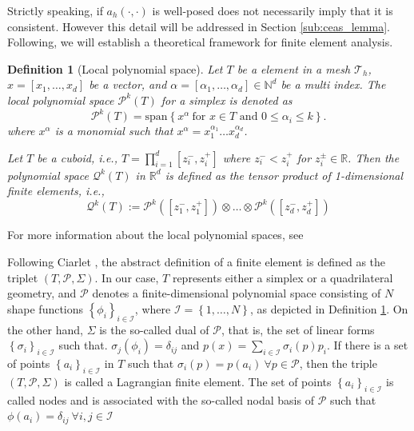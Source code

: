 \documentclass[11pt]{article}
\newtheorem{definition}[theorem]{Definition}
\theoremstyle{remark}
\renewcommand{\le}{\leqslant}
\numberwithin{equation}{section}
\begin{document}
Strictly speaking, if $a_{h}( \cdot ,\cdot ) $ is well-posed does not necessarily imply that it is consistent. However this detail will be addressed in Section \ref{sub:ceas_lemma}.
Following, we will establish a theoretical framework for finite element analysis.
\begin{definition}[Local polynomial space]
    \label{def:local_space}
    Let $T$ be a element in a mesh $\mathcal{T}_{h} $,  $x = \left[ x_{1}, \ldots, x_{d} \right] $ be a vector, and $\alpha  = \left[ \alpha _{1}, \ldots, \alpha _{d} \right] \in \mathbb{N} ^{d} $ be a multi index.
    The local polynomial space $\mathcal{P} ^{k}( T) $ for a simplex is denoted as
    \begin{equation}
    \label{eq:pol_space}
        \mathcal{P}^{k}( T) =  \mathrm{span}\left\{ x^{\alpha } \ \text{for } x \in T \text{ and } 0 \le  \alpha _{i} \le k \right\}.
    \end{equation}
    where  $x^{\alpha }$ is a monomial such that $x^{\alpha } = x_{1}^{\alpha _{1}} \ldots x_{d}^{\alpha _{d}}$.

    Let $T$ be a cuboid, i.e.,  $T = \prod_{i=1}^{d} [z_{i}^{-},z_{i}^{+}]$ where $z_{i}^{-}< z_{i}^{+}$ for $z_{i}^{\pm} \in \mathbb{R} $. Then the polynomial space $\mathcal{Q}^{k}( T)$  in $\mathbb{R} ^{d}$ is defined as the tensor product of 1-dimensional
    finite elements, i.e.,
      \[
    \mathcal{Q} ^{k}(T)  := \mathcal{P}^{k}( [z_{1}^{-},z_{1}^{+}] ) \otimes \ldots \otimes \mathcal{P}^{k}( [z_{d}^{-},z_{d}^{+}] )
    \]
\end{definition}
For more information about the local polynomial spaces, see \cite[Chapter 6.4, 7.3]{ErnGuermond2021}

Following Ciarlet \cite[pp.93]{ciarlet1991basic}, the abstract definition of a finite element is defined as the triplet $( T, \mathcal{P}, \Sigma ) $.
In our case, $T$ represents either a simplex or a quadrilateral geometry, and $\mathcal{P}$ denotes a finite-dimensional polynomial space consisting of $N$ shape functions $\left\{ \phi_{i} \right\}_{i\in \mathcal{I} } $, where $\mathcal{I} = \left\{
1, \ldots, N \right\} $, as depicted in Definition \ref{def:local_space}.
On the other hand, $\Sigma $ is the so-called dual of $\mathcal{P}$, that is, the set of linear forms $\left\{ \sigma _{i} \right\}_{i \in \mathcal{I} } $ such that. $ \sigma_{j} ( \phi_{i} ) = \delta _{ij}$ and $p( x) = \sum_{i\in \mathcal{I} }^{} \sigma_{i} ( p) p_{i} $.
If there is a set of points $\left\{ a_{i} \right\}_{i \in \mathcal{I} } $  in $T$ such that
$\sigma_{i}( p) = p( a_{i}) \  \forall p \in \mathcal{P}$,  then the triple $( T, \mathcal{P}, \Sigma  ) $ is called a Lagrangian finite element. The set of points $\left\{ a_{i} \right\}_{i \in \mathcal{I} }  $ is called nodes and is associated with the
so-called nodal basis of $\mathcal{P} $ such that  $\phi ( a_{i}) = \delta _{ij} \ \forall i,j  \in \mathcal{I} $
\end{document}
